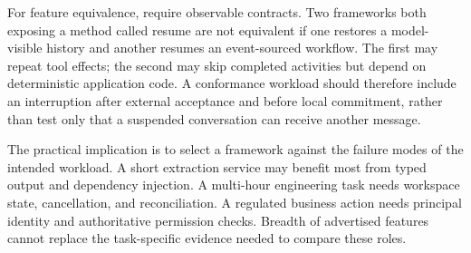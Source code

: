 For feature equivalence, require observable contracts. Two frameworks both exposing a method called resume are not equivalent if one restores a model-visible history and another resumes an event-sourced workflow. The first may repeat tool effects; the second may skip completed activities but depend on deterministic application code. A conformance workload should therefore include an interruption after external acceptance and before local commitment, rather than test only that a suspended conversation can receive another message.

The practical implication is to select a framework against the failure modes of the intended workload. A short extraction service may benefit most from typed output and dependency injection. A multi-hour engineering task needs workspace state, cancellation, and reconciliation. A regulated business action needs principal identity and authoritative permission checks. Breadth of advertised features cannot replace the task-specific evidence needed to compare these roles.

